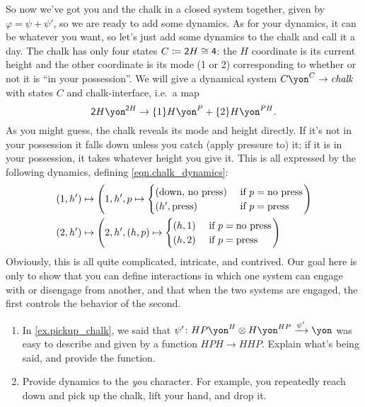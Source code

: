 \documentclass[Book-Poly]{subfiles}
\begin{document}
\begin{example}
So now we've got you and the chalk in a closed system together, given by $\varphi=\psi+\psi'$, so we are ready to add some dynamics. As for your dynamics, it can be whatever you want, so let's just add some dynamics to the chalk and call it a day. The chalk  has only four states $C\coloneqq \textsf{2}H\cong\textsf{4}$: the $H$ coordinate is its current height and the other coordinate is its mode (1 or 2) corresponding to whether or not it is ``in your possession''. We will give a dynamical system $C\yon^C\to\textit{chalk}$ with states $C$ and chalk-interface, i.e.\ a map
\begin{equation}\label{eqn.chalk_dynamics}
	\2H\yon^{\2H}\to \{1\}H\yon^P + \{2\}H\yon^{PH}.
\end{equation}
As you might guess, the chalk reveals its mode and height directly. If it's not in your possession it falls down unless you catch (apply pressure to) it; if it is in your possession, it takes whatever height you give it. This is all expressed by the following dynamics, defining \eqref{eqn.chalk_dynamics}:
\begin{align*}
  (1,h')&\mapsto
  	\left(1,h',p\mapsto
		\begin{cases}
			(\text{down, no press})&\textnormal{ if }p=\text{no press}\\
			(h',\text{press})&\textnormal{ if }p=\text{press}
		\end{cases}\right)\\
	(2, h')&\mapsto
		\left(2,h',(h,p)\mapsto
		\begin{cases}
			(h,1)&\textnormal{ if }p=\text{no press}\\
			(h,2)&\textnormal{ if }p=\text{press}
		\end{cases}\right)
\end{align*}
Obviously, this is all quite complicated, intricate, and contrived. Our goal here is only to show that you can define interactions in which one system can engage with or disengage from another, and that when the two systems are engaged, the first controls the behavior of the second.
\end{example}

\begin{exercise}\label{exc.pickup_chalk}
\begin{enumerate}
	\item In \cref{ex.pickup_chalk}, we said that $\psi'\colon HP\yon^H\otimes H\yon^{HP}\To{\psi'}\yon$ was easy to describe and given by a function $HPH\to HHP$. Explain what's being said, and provide the function.
	\item Provide dynamics to the \textit{you} character. For example, you repeatedly reach down and pick up the chalk, lift your hand, and drop it. 
\qedhere
\end{enumerate}
\end{exercise}
\end{document}
